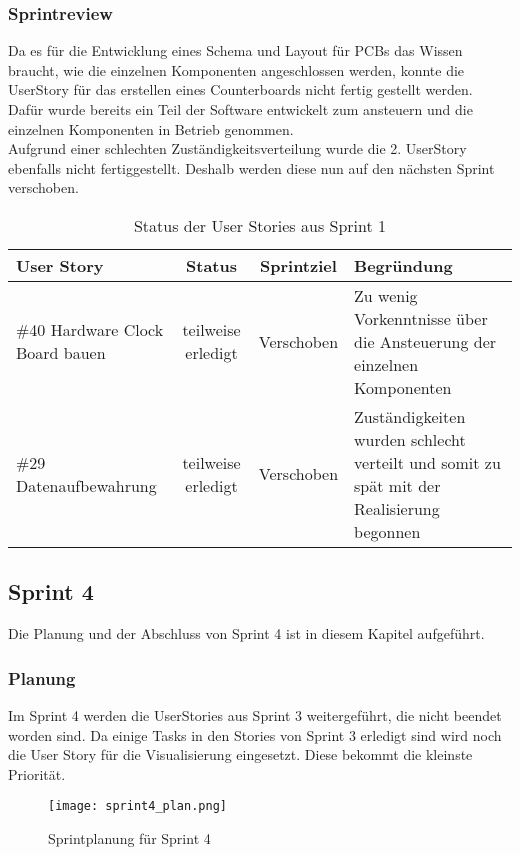 \subsubsection*{Sprintreview}
Da es für die Entwicklung eines Schema und Layout für PCBs das Wissen braucht, wie die einzelnen Komponenten angeschlossen werden, konnte die UserStory für das erstellen eines Counterboards nicht fertig gestellt werden. Dafür wurde bereits ein Teil der Software entwickelt zum ansteuern und die einzelnen Komponenten in Betrieb genommen.\\
Aufgrund einer schlechten Zuständigkeitsverteilung wurde die 2. UserStory ebenfalls nicht fertiggestellt. Deshalb werden diese nun auf den nächsten Sprint verschoben.
\begin{table}[H]
    \centering
    \begin{tabular}{p{4cm}ccp{7cm}}
        \textbf{User Story} &  \textbf{Status} & \textbf{Sprintziel}& \textbf{Begründung}\\\toprule[2pt]
        \#40 Hardware Clock Board bauen & teilweise erledigt & Verschoben & Zu wenig Vorkenntnisse über die Ansteuerung der einzelnen Komponenten\\
        \#29 Datenaufbewahrung & teilweise erledigt & Verschoben & Zuständigkeiten wurden schlecht verteilt und somit zu spät mit der Realisierung begonnen\\
    \end{tabular}
    \caption{Status der User Stories aus Sprint 1}
\end{table}

\clearpage
\subsection*{Sprint 4}
Die Planung und der Abschluss von Sprint 4 ist in diesem Kapitel aufgeführt.
\subsubsection*{Planung}
Im Sprint 4 werden die UserStories aus Sprint 3 weitergeführt, die nicht beendet worden sind. Da einige Tasks in den Stories von Sprint 3 erledigt sind wird noch die User Story für die Visualisierung eingesetzt. Diese bekommt die kleinste Priorität.
\begin{figure}[H]
    \centering
    \texttt{[image: sprint4\_plan.png]}
    \caption{Sprintplanung für Sprint 4}
\end{figure}

